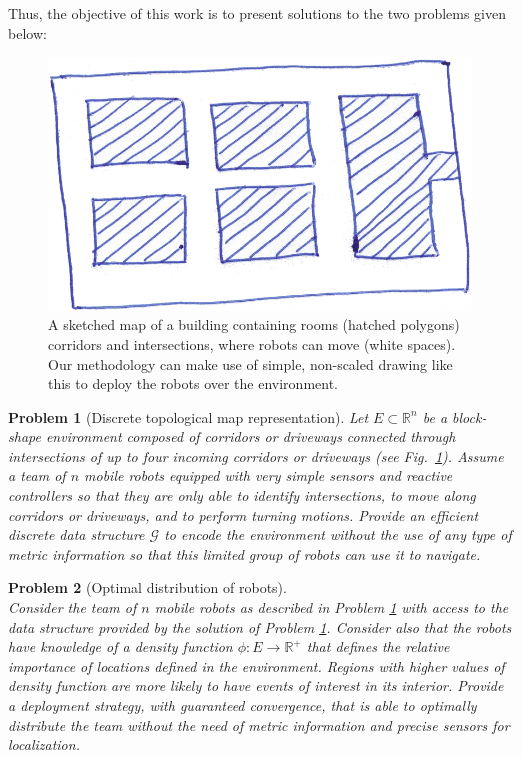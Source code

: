 \documentclass[smallcondensed]{svjour3}
\newtheorem{myprob}{Problem}
\begin{document}
Thus, the objective of this work is to present solutions to the two problems given below:


\begin{figure}[t]
\centering
\includegraphics[width=0.7\columnwidth]{Figures/Fig3.png}
\caption{A sketched map of a building containing rooms (hatched polygons) corridors and intersections, where robots can move (white spaces). Our methodology can make use of simple, non-scaled drawing like this to deploy the robots over the environment.}
\label{fig:blockemap}
\end{figure}

\begin{myprob}[Discrete topological map representation]
\label{problem1}
%
\textnormal{
Let $E \subset \mathbb{R}^{n}$ be a block-shape environment composed of corridors or driveways connected through intersections of up to four incoming corridors or driveways (see Fig.~\ref{fig:blockemap}). Assume a team of $n$ mobile robots equipped with very simple sensors and reactive controllers so that they are only able to identify intersections, to move along corridors or driveways, and to perform turning motions.  
\textit{Provide an efficient discrete data structure $\mathcal G$ to encode the environment without the use of any type of metric information so that this limited group of robots can use it to navigate.}
}
\end{myprob}

\begin{myprob}[Optimal distribution of robots]
\label{Prob:deployment}
%
\textnormal{\\
%
Consider the team of $n$ mobile robots as described in Problem \ref{problem1} with access to the data structure provided by the solution of Problem \ref{problem1}. Consider also that the robots have knowledge of a density function $\phi:E \rightarrow \mathbb{R}^+$ that defines the relative importance of locations defined in the environment. Regions with higher values of density function are more likely to have events of interest in its interior. \textit{Provide a deployment strategy, with guaranteed convergence, that is able to optimally distribute the team without the need of metric information and precise sensors for localization.}
}
\end{myprob}
\end{document}
